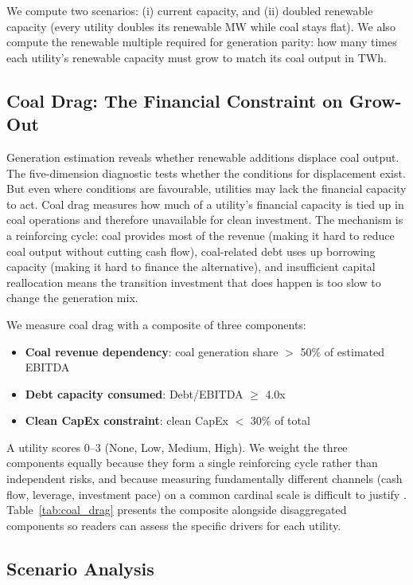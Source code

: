 \documentclass[review,3p,authoryear]{elsarticle}
\begin{document}
We compute two scenarios: (i) current capacity, and (ii) doubled renewable capacity (every utility doubles its renewable MW while coal stays flat). We also compute the renewable multiple required for generation parity: how many times each utility's renewable capacity must grow to match its coal output in TWh.

\subsection{Coal Drag: The Financial Constraint on Grow-Out}
\label{sec:coal_drag}

Generation estimation reveals whether renewable additions displace coal output. The five-dimension diagnostic tests whether the conditions for displacement exist. But even where conditions are favourable, utilities may lack the financial capacity to act. Coal drag measures how much of a utility's financial capacity is tied up in coal operations and therefore unavailable for clean investment. The mechanism is a reinforcing cycle: coal provides most of the revenue (making it hard to reduce coal output without cutting cash flow), coal-related debt uses up borrowing capacity (making it hard to finance the alternative), and insufficient capital reallocation means the transition investment that does happen is too slow to change the generation mix.

We measure coal drag with a composite of three components:

\begin{itemize}
\item \textbf{Coal revenue dependency}: coal generation share $>$ 50\% of estimated EBITDA
\item \textbf{Debt capacity consumed}: Debt/EBITDA $\geq$ 4.0x
\item \textbf{Clean CapEx constraint}: clean CapEx $<$ 30\% of total
\end{itemize}

A utility scores 0--3 (None, Low, Medium, High). We weight the three components equally because they form a single reinforcing cycle rather than independent risks, and because measuring fundamentally different channels (cash flow, leverage, investment pace) on a common cardinal scale is difficult to justify \citep{Berg2022}. Table~\ref{tab:coal_drag} presents the composite alongside disaggregated components so readers can assess the specific drivers for each utility.

\subsection{Scenario Analysis}
\label{sec:scenarios}
\end{document}
